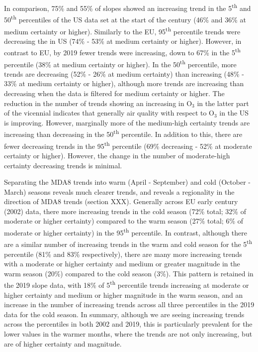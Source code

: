 \documentclass[journal abbreviation, manuscript]{copernicus}
\begin{document}
In comparison, 75\%  and 55\% of slopes showed an increasing trend in the 5\textsuperscript{th} and 50\textsuperscript{th} percentiles of the US data set at the start of the century (46\% and 36\% at medium certainty or higher). Similarly to the EU, 95\textsuperscript{th} percentile trends were decreasing the in US (74\% - 53\% at medium certainty or higher). However, in contrast to EU, by 2019 fewer trends were increasing, down to 67\% in the 5\textsuperscript{th} percentile (38\% at medium certainty or higher). In the 50\textsuperscript{th} percentile, more trends are decreasing (52\% - 26\% at medium certainty) than increasing (48\% - 33\% at medium certainty or higher), although more trends are increasing than decreasing when the data is filtered for medium certainty or higher. The reduction in the number of trends showing an increasing in O$_3$ in the latter part of the vicennial indicates that generally air quality with respect to O$_3$ in the US is improving. However, marginally more of the medium-high certainty trends are increasing than decreasing in the 50\textsuperscript{th} percentile. In addition to this, there are fewer decreasing trends in the 95\textsuperscript{th} percentile (69\% decreasing - 52\% at moderate certainty or higher). However, the change in the number of moderate-high certainty decreasing trends is minimal.

Separating the MDA8 trends into warm (April - September) and cold (October - March) seasons reveals much clearer trends, and reveals a regionality in the direction of MDA8 trends (section XXX). Generally across EU early century (2002) data, there more increasing trends in the cold season (72\% total;  32\% of moderate or higher certainty) compared to the warm season (27\% total; 6\% of moderate or higher certainty) in the 95\textsuperscript{th} percentile. In contrast, although there are a similar number of increasing trends in the warm and cold season for the 5\textsuperscript{th} percentile (81\% and 83\% respectively), there are many more increasing trends with a moderate or higher certainty and medium or greater magnitude in the warm season (20\%) compared to the cold season (3\%). This pattern is retained in the 2019 slope data, with 18\% of 5\textsuperscript{th} percentile trends increasing at moderate or higher certainty and medium or higher magnitude in the warm season, and an increase in the number of increasing trends across all three percentiles in the 2019 data for the cold season. In summary, although we are seeing increasing trends across the percentiles in both 2002 and 2019, this is particularly prevalent for the lower values in the warmer months, where the trends are not only increasing, but are of higher certainty and magnitude.
\end{document}

